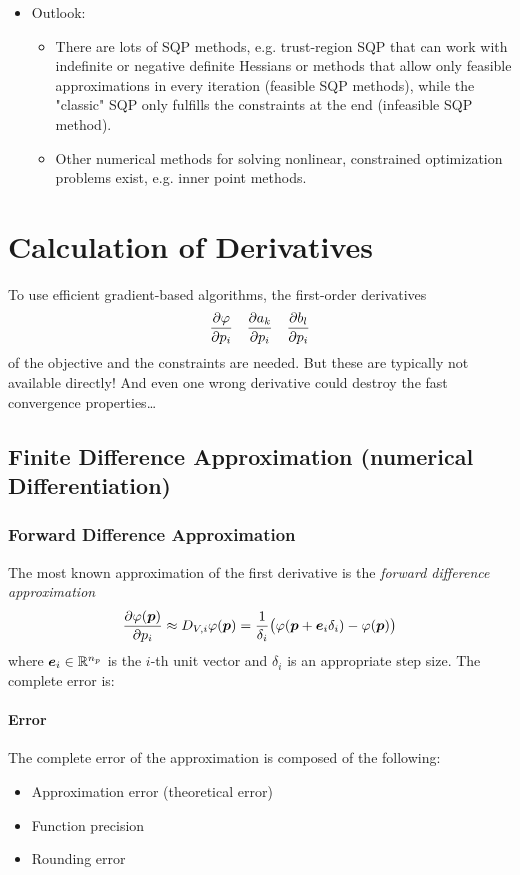 \begin{itemize}
\begin{itemize}
					\end{itemize}
				\item Outlook:
					\begin{itemize}
						\item There are lots of SQP methods, e.g. trust-region SQP that can work with indefinite or negative definite Hessians or methods that allow only feasible approximations in every iteration (feasible SQP methods), while the "classic" SQP only fulfills the constraints at the end (infeasible SQP method).
						\item Other numerical methods for solving nonlinear, constrained optimization problems exist, e.g. inner point methods.
					\end{itemize}
			\end{itemize}

\chapter{Calculation of Derivatives}
	To use efficient gradient-based algorithms, the first-order derivatives
	\begin{align*}
		\pdv{\varphi}{p_i} &  & \pdv{a_k}{p_i} &  & \pdv{b_l}{p_i}
	\end{align*}
	of the objective and the constraints are needed. But these are typically not available directly! And even one wrong derivative could destroy the fast convergence properties\dots

	\section{Finite Difference Approximation (numerical Differentiation)}
		\subsection{Forward Difference Approximation}
			The most known approximation of the first derivative  is the \emph{forward difference approximation}
			\begin{align*}
				\pdv{\varphi(\bm{p})}{p_i} \approx D_{V, i} \varphi(\bm{p}) = \frac{1}{\delta_i} \big( \varphi(\bm{p} + \bm{e}_i \delta_i) - \varphi(\bm{p}) \big)
			\end{align*}
			where \( \bm{e}_i \in \mathbb{R}^{n_p} \) is the \(i\)-th unit vector and \(\delta_i\) is an appropriate step size. The complete error is:

			\subsubsection{Error}
				The complete error of the approximation is composed of the following:
				\begin{itemize}
					\item Approximation error (theoretical error)
					\item Function precision
					\item Rounding error
				\end{itemize}


